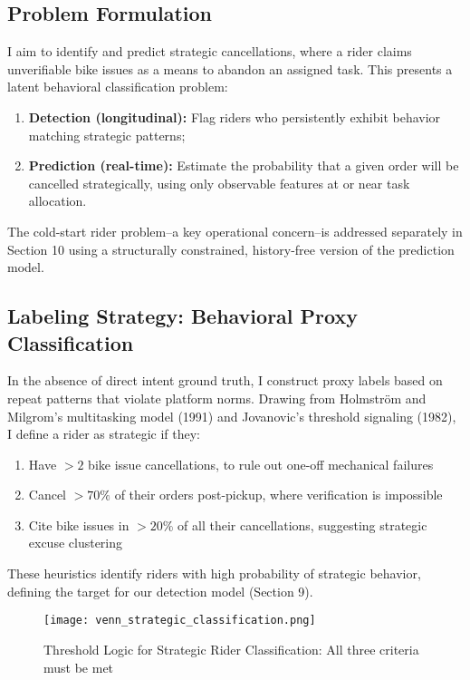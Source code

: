 \documentclass[12pt,letterpaper]{article}
\begin{document}
\subsection{Problem Formulation}

I aim to identify and predict strategic cancellations, where a rider claims unverifiable bike issues as a means to abandon an assigned task. This presents a latent behavioral classification problem:

\begin{enumerate}
    \item \textbf{Detection (longitudinal):} Flag riders who persistently exhibit behavior matching strategic patterns;
    \item \textbf{Prediction (real-time):} Estimate the probability that a given order will be cancelled strategically, using only observable features at or near task allocation.
\end{enumerate}

The cold-start rider problem--a key operational concern--is addressed separately in Section 10 using a structurally constrained, history-free version of the prediction model.

\subsection{Labeling Strategy: Behavioral Proxy Classification}

In the absence of direct intent ground truth, I construct proxy labels based on repeat patterns that violate platform norms. Drawing from Holmström and Milgrom's multitasking model (1991) and Jovanovic's threshold signaling (1982), I define a rider as strategic if they:

\begin{enumerate}
    \item Have $>2$ bike issue cancellations, to rule out one-off mechanical failures
    \item Cancel $>70\%$ of their orders post-pickup, where verification is impossible
    \item Cite bike issues in $>20\%$ of all their cancellations, suggesting strategic excuse clustering
\end{enumerate}

These heuristics identify riders with high probability of strategic behavior, defining the target for our detection model (Section 9).

\begin{figure}[H]
\centering
\texttt{[image: venn\_strategic\_classification.png]}
\caption{Threshold Logic for Strategic Rider Classification: All three criteria must be met}
\label{fig:venn}
\end{figure}
\end{document}
